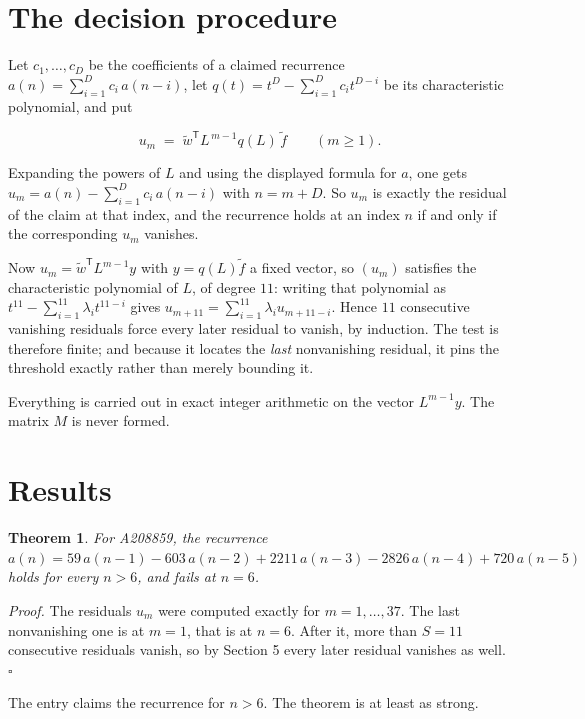 \documentclass[11pt]{article}
\newtheorem{theorem}{Theorem}
\theoremstyle{definition}
\begin{document}
\section{The decision procedure}

Let $c_1,\dots,c_D$ be the coefficients of a claimed recurrence $a(n) = \sum_{i=1}^{D} c_i\,a(n-i)$, let $q(t) = t^{D} - \sum_{i=1}^{D} c_i t^{D-i}$ be its characteristic polynomial, and put

\[u_m \;=\; \tilde w^{\mathsf T} L^{\,m-1} q(L)\,\tilde f \qquad (m \ge 1).\]

Expanding the powers of $L$ and using the displayed formula for $a$, one gets $u_m = a(n) - \sum_{i=1}^{D} c_i\,a(n-i)$ with $n = m + D$. So $u_m$ is exactly the residual of the claim at that index, and the recurrence holds at an index $n$ if and only if the corresponding $u_m$ vanishes.

Now $u_m = \tilde w^{\mathsf T} L^{m-1} y$ with $y = q(L)\tilde f$ a fixed vector, so $(u_m)$ satisfies the characteristic polynomial of $L$, of degree $11$: writing that polynomial as $t^{11} - \sum_{i=1}^{11} \lambda_i t^{11-i}$ gives $u_{m+11} = \sum_{i=1}^{11} \lambda_i u_{m+11-i}$. Hence $11$ consecutive vanishing residuals force every later residual to vanish, by induction. The test is therefore finite; and because it locates the {\itshape last} nonvanishing residual, it pins the threshold exactly rather than merely bounding it.

Everything is carried out in exact integer arithmetic on the vector $L^{m-1}y$. The matrix $M$ is never formed.

\section{Results}

\begin{theorem} For A208859, the recurrence $a(n) = 59\,a(n-1) - 603\,a(n-2) + 2211\,a(n-3) - 2826\,a(n-4) + 720\,a(n-5)$ holds for every $n > 6$, and fails at $n = 6$.\end{theorem}

{\itshape Proof.} The residuals $u_m$ were computed exactly for $m = 1,\dots,37$. The last nonvanishing one is at $m = 1$, that is at $n = 6$. After it, more than $S = 11$ consecutive residuals vanish, so by Section 5 every later residual vanishes as well. $\square$

The entry claims the recurrence for $n > 6$. The theorem is at least as strong.
\end{document}
